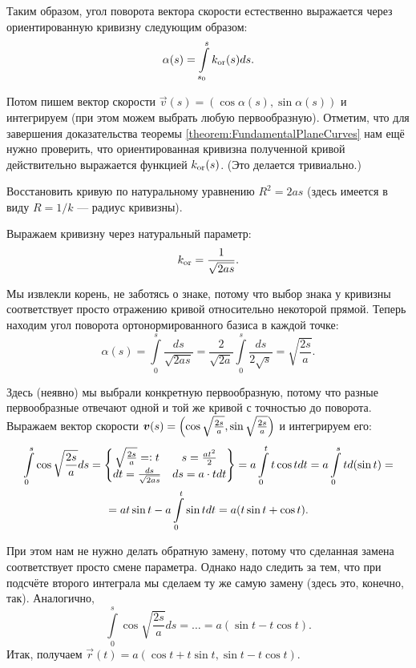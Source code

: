 Таким образом, угол поворота вектора скорости естественно выражается через ориентированную кривизну следующим образом:
\begin{equation} \label{eq:AngleByCurvature}
	\alpha(s) = \int\limits_{s_0}^sk_{\mathrm{or}}(s)ds.
\end{equation}

Потом пишем вектор скорости $\vec{v}(s) = (\cos\alpha(s), \sin\alpha(s))$ и интегрируем (при этом можем выбрать любую первообразную). Отметим, что для завершения доказательства теоремы \ref{theorem:FundamentalPlaneCurves} нам ещё нужно проверить, что ориентированная кривизна полученной кривой действительно выражается функцией $k_{\mathrm{or}}(s)$. (Это делается тривиально.)

\begin{problem} \label{problem:NaturalEquation}
	Восстановить кривую по натуральному уравнению $R^2 = 2as$ (здесь имеется в виду $R = 1 / k$ --- радиус кривизны).
\end{problem}

\begin{solution}
	Выражаем кривизну через натуральный параметр:
	\[
		k_{\mathrm{or}} = \frac{1}{\sqrt{2as}}.
	\]

	Мы извлекли корень, не заботясь о знаке, потому что выбор знака у кривизны соответствует просто отражению кривой относительно некоторой прямой. Теперь находим угол поворота ортонормированного базиса в каждой точке:
	\[
		\alpha(s) = \int\limits_0^s\frac{ds}{\sqrt{2as}} = \frac{2}{\sqrt{2a}}\int\limits_0^s\frac{ds}{2\sqrt{s}} = \sqrt{\frac{2s}{a}}.
	\]

	Здесь (неявно) мы выбрали конкретную первообразную, потому что разные первообразные отвечают одной и той же кривой с точностью до поворота. Выражаем вектор скорости $\boldsymbol{v}(s) = \left(\cos\sqrt{\frac{2s}{a}}, \sin\sqrt{\frac{2s}{a}}\right)$ и интегрируем его:
	\begin{multline*}
		\int\limits_0^s\cos\sqrt{\frac{2s}{a}}ds = \left\{
			\begin{matrix}
				\sqrt{\frac{2s}{a}} = \vcentcolon t & s = \frac{at^2}{2} \\
				dt = \frac{ds}{\sqrt{2as}} & ds = a \cdot t dt
			\end{matrix}
			\right\} = a\int\limits_0^tt\cos t dt = a\int\limits_0^std(\sin t) =\\ = a t\sin t - a\int\limits_0^t\sin tdt = a(t\sin t + \cos t).
	\end{multline*}

	При этом нам не нужно делать обратную замену, потому что сделанная замена соответствует просто смене параметра. Однако надо следить за тем, что при подсчёте второго интеграла мы сделаем ту же самую замену (здесь это, конечно, так). Аналогично,
	\[
		\int\limits_0^s\cos\sqrt{\frac{2s}{a}}ds = \ldots = a(\sin t - t\cos t).
	\]
	Итак, получаем $\vec{r}(t) = a(\cos t + t \sin t, \sin t - t \cos t)$.
\end{solution}

